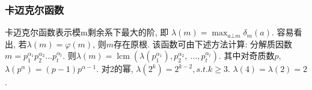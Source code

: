 \subsubsection{卡迈克尔函数}
卡迈克尔函数表示模m剩余系下最大的阶, 即 $\lambda(m)=\max_{a\bot m} \delta_m(a)$. 容易看出, 若$\lambda(m)=\varphi(m)$, 则$m$存在原根. 该函数可由下述方法计算: 分解质因数$m=p_1^{\alpha_1}p_2^{\alpha_2}...p_t^{\alpha_t}$. 则$\lambda(m)=\operatorname{lcm}(\lambda(p_1^{\alpha_1}),p_2^{\alpha_2},\ ..., p_t^{\alpha_t})$. 其中对奇质数$p$, $\lambda(p^\alpha)=(p-1)p^{\alpha-1}$. 对2的幂, $\lambda(2^k)=2^{k-2}, s.t. k\ge 3$. $\lambda(4)=\lambda(2)=2$.
